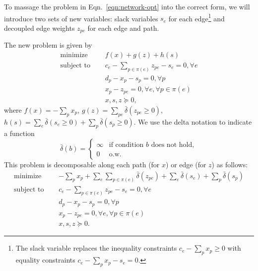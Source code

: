 \documentclass[11pt]{article}
\begin{document}
To massage the problem in Eqn.~\ref{eqn:network-opt} into the correct form,
we will introduce two sets of new variables: slack variables $s_e$ for each edge\footnote{
The slack variable replaces the inequality constraints $c_e - \sum_p x_p \ge 0$
with equality constraints $c_e - \sum_p x_p - s_e = 0$.
}
and decoupled edge weights $z_{pe}$ for each edge and path.

The new problem is given by
\begin{equation}
\label{eqn:network-opt-std}
\begin{aligned}
\textrm{minimize } \quad & f(x) + g(z) + h(s)\\
\textrm{subject to } \quad &c_e - \sum_{p\in\pi(e)}z_{pe} - s_{e} = 0, \forall e\\
& d_p - x_p - s_p = 0, \forall p\\
&x_p - z_{pe} = 0, \forall e, \forall p \in \pi(e)\\
&x,s,z \succeq 0,
\end{aligned}
\end{equation}
where $f(x) = -\sum_p x_p$,
$g(z) = \sum_{pe} \bar\delta(z_{pe} \ge 0)$,
$h(s) = \sum_{e} \bar\delta(s_{e} \ge 0)+ \sum_{p} \bar\delta(s_{p} \ge 0) $.
We use the delta notation to indicate a function
$$
\bar\delta(b) = \begin{cases}
    \infty & \textrm{if condition } b \textrm{ does not hold},\\
    0 & \textrm{o.w.}
\end{cases}
$$
This problem is decomposable along each path (for $x$) or edge (for $z$) as follows:
\begin{equation}
\label{eqn:network-opt-sep}
\begin{aligned}
\textrm{minimize } \quad & -\sum_p x_p
    + \sum_e\sum_{p \in \pi(e)} \bar\delta(z_{pe})
    + \sum_e \bar\delta(s_{e}) + \sum_p \bar\delta(s_p)\\
\textrm{subject to } \quad &c_e - \sum_{p\in\pi(e)}z_{pe} - s_{e} = 0, \forall e\\
& d_p - x_p - s_p = 0, \forall p\\
&x_p - z_{pe} = 0, \forall e, \forall p \in \pi(e)\\
&x,s,z \succeq 0.
\end{aligned}
\end{equation}
\end{document}
